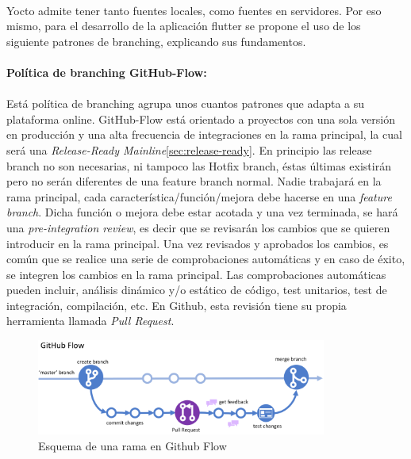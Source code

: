 \paragraph{}Yocto admite tener tanto fuentes locales, como fuentes en servidores. Por
eso mismo, para el desarrollo de la aplicación flutter se propone el uso de los
siguiente patrones de branching, explicando sus fundamentos.

\paragraph{Política de branching GitHub-Flow:}
\paragraph{}Está política de branching agrupa unos
cuantos patrones que adapta a su plataforma online. GitHub-Flow está orientado a proyectos
con una sola versión en producción y una alta frecuencia de integraciones en la rama
principal, la cual será una \emph{Release-Ready Mainline}\ref{sec:release-ready}. En
principio las release branch no son necesarias, ni tampoco las Hotfix branch, éstas
últimas existirán pero no serán diferentes de una feature branch normal. Nadie trabajará
en la rama principal, cada característica/función/mejora debe hacerse en una \emph{feature
branch}. Dicha función o mejora debe estar acotada y una vez terminada, se hará una
\emph{pre-integration review}, es decir que se revisarán los cambios que se quieren
introducir en la rama principal. Una vez revisados y aprobados los cambios, es común
que se realice una serie de comprobaciones automáticas y en caso de éxito, se integren
los cambios en la rama principal. Las comprobaciones automáticas pueden incluir, análisis
dinámico y/o estático de código, test unitarios, test de integración, compilación, etc.
En Github, esta revisión tiene su propia herramienta llamada \emph{Pull Request}.

\begin{figure}[H]
    \centering
    \includegraphics[width=0.85\textwidth]{imgs/github-flow}
    \caption{Esquema de una rama en Github Flow}
    \label{imgs:github-flow}
\end{figure}

